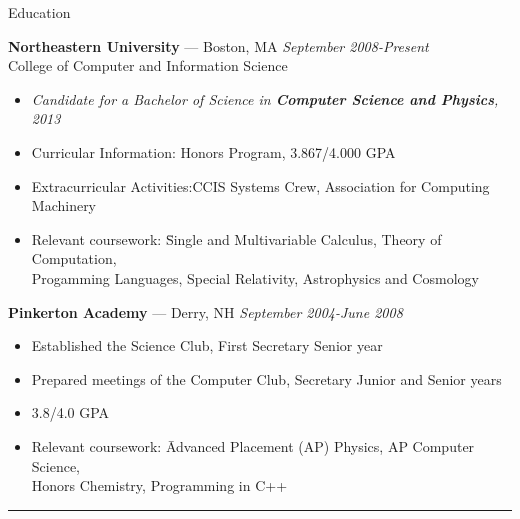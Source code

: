 \documentclass[10pt]{letter}
\begin{document}
{\Large Education}
\begin{tabbing}
{\large \bf Northeastern University} --- Boston, MA \` \textit{September 2008-Present} \\
College of Computer and Information Science
\end{tabbing}\vspace{-15pt}

\begin{itemize}
\setlength\itemsep{1pt}
\item[] \textit{Candidate for a Bachelor of Science in \textbf{Computer Science and Physics}, 2013}
\item Curricular Information:\hspace{.355in} Honors Program, 3.867/4.000 GPA
\item Extracurricular Activities:\hspace{.245in}CCIS Systems Crew, Association for Computing Machinery
\item \begin{tabbing}Relevant coursework:\hspace{.5in} \= Single and Multivariable Calculus, Theory of Computation,\\
  \> Progamming Languages, Special Relativity, Astrophysics and Cosmology\end{tabbing}
\end{itemize}

\begin{tabbing}
{\large \bf Pinkerton Academy} --- Derry, NH \` \textit{September 2004-June 2008}
\end{tabbing}\vspace{-15pt}
\begin{itemize}
\setlength\itemsep{1pt}
\item Established the Science Club, First Secretary Senior year
\item Prepared meetings of the Computer Club, Secretary Junior and Senior years
\item 3.8/4.0 GPA
\item \begin{tabbing}Relevant coursework:\hspace{.5in} \= Advanced Placement (AP) Physics, AP Computer Science,\\
	\> Honors Chemistry, Programming in C++\end{tabbing}
\end{itemize}\vspace{-15pt}

\rule{\linewidth}{.5pt}
\end{document}
